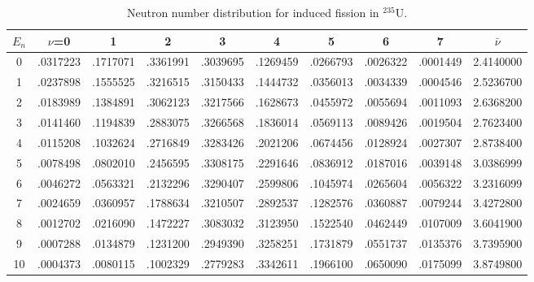 \begin{table}[ht]
\footnotesize
\begin{center}
\begin{tabular}{|c|cccccccc|c|} \hline
$E_n$ & $\nu$=0 & 1 & 2 & 3 & 4 & 5 & 6 & 7 & $\bar{\nu}$ \\ \hline
0 & .0317223 & .1717071 & .3361991 & .3039695 & .1269459 & .0266793 & .0026322 & .0001449 & 2.4140000 \\
1 & .0237898 & .1555525 & .3216515 & .3150433 & .1444732 & .0356013 & .0034339 & .0004546 & 2.5236700 \\
2 & .0183989 & .1384891 & .3062123 & .3217566 & .1628673 & .0455972 & .0055694 & .0011093 & 2.6368200 \\
3 & .0141460 & .1194839 & .2883075 & .3266568 & .1836014 & .0569113 & .0089426 & .0019504 & 2.7623400 \\
4 & .0115208 & .1032624 & .2716849 & .3283426 & .2021206 & .0674456 & .0128924 & .0027307 & 2.8738400 \\
5 & .0078498 & .0802010 & .2456595 & .3308175 & .2291646 & .0836912 & .0187016 & .0039148 & 3.0386999 \\
6 & .0046272 & .0563321 & .2132296 & .3290407 & .2599806 & .1045974 & .0265604 & .0056322 & 3.2316099 \\
7 & .0024659 & .0360957 & .1788634 & .3210507 & .2892537 & .1282576 & .0360887 & .0079244 & 3.4272800 \\
8 & .0012702 & .0216090 & .1472227 & .3083032 & .3123950 & .1522540 & .0462449 & .0107009 & 3.6041900 \\
9 & .0007288 & .0134879 & .1231200 & .2949390 & .3258251 & .1731879 & .0551737 & .0135376 & 3.7395900 \\
10& .0004373 & .0080115 & .1002329 & .2779283 & .3342611 & .1966100 & .0650090 & .0175099 & 3.8749800 \\ \hline
\end{tabular}
\end{center}
\caption{Neutron number distribution for induced fission in $^{235}$U.}
\label{Neutron number distribution for induced fission in 235U}
\end{table}

